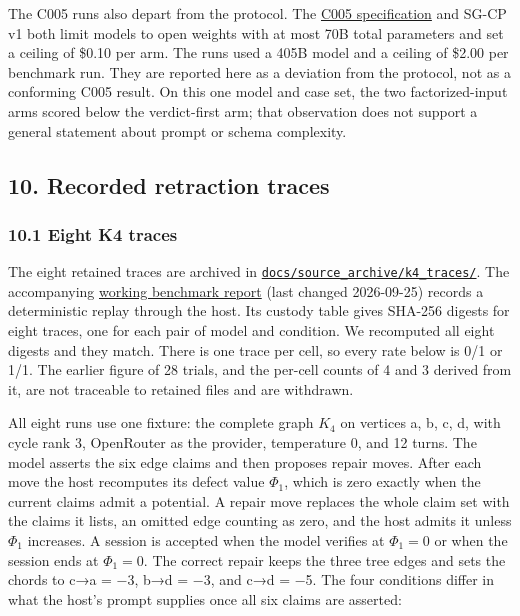 \documentclass[
  11pt,
]{article}
\begin{document}
The C005 runs also depart from the protocol. The
\href{https://github.com/dbccpage/the_symbol_game/blob/a623568eb0f853b968bc419bf06dfc6af256ab02/omega_engine_projects/mssn_sn_symgam/challenges/a_mechanism/c005_hosted_decode_controls_bakeoff.md}{C005
specification} and SG-CP v1 both limit models to open weights with at
most 70B total parameters and set a ceiling of \$0.10 per arm. The runs
used a 405B model and a ceiling of \$2.00 per benchmark run. They are
reported here as a deviation from the protocol, not as a conforming C005
result. On this one model and case set, the two factorized-input arms
scored below the verdict-first arm; that observation does not support a
general statement about prompt or schema complexity.

\hypertarget{recorded-retraction-traces}{%
\subsection{10. Recorded retraction
traces}\label{recorded-retraction-traces}}

\hypertarget{eight-k4-traces}{%
\subsubsection{10.1 Eight K4 traces}\label{eight-k4-traces}}

The eight retained traces are archived in
\href{../../008_pfp_mssn_tower_challenges_and_retraction_benchmarks/docs/source_archive/README.md}{\nolinkurl{docs/source_archive/k4_traces/}}.
The accompanying
\href{../../008_pfp_mssn_tower_challenges_and_retraction_benchmarks/docs/source_archive/k4_benchmark_report.md}{working
benchmark report} (last changed 2026-09-25) records a deterministic
replay through the host. Its custody table gives SHA-256 digests for
eight traces, one for each pair of model and condition. We recomputed
all eight digests and they match. There is one trace per cell, so every
rate below is 0/1 or 1/1. The earlier figure of 28 trials, and the
per-cell counts of 4 and 3 derived from it, are not traceable to
retained files and are withdrawn.

All eight runs use one fixture: the complete graph \(K_4\) on vertices
a, b, c, d, with cycle rank 3, OpenRouter as the provider, temperature
0, and 12 turns. The model asserts the six edge claims and then proposes
repair moves. After each move the host recomputes its defect value
\(\Phi_1\), which is zero exactly when the current claims admit a
potential. A repair move replaces the whole claim set with the claims it
lists, an omitted edge counting as zero, and the host admits it unless
\(\Phi_1\) increases. A session is accepted when the model verifies at
\(\Phi_1=0\) or when the session ends at \(\Phi_1=0\). The correct
repair keeps the three tree edges and sets the chords to c→a = −3, b→d =
−3, and c→d = −5. The four conditions differ in what the host's prompt
supplies once all six claims are asserted:
\end{document}
